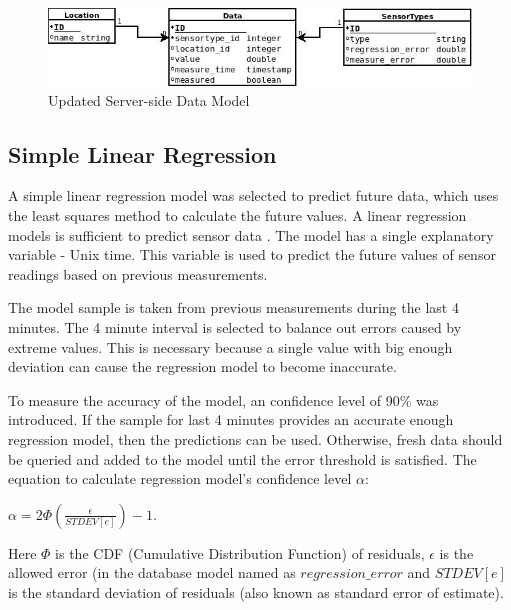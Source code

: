 \begin{figure}[h!]
\centering
\includegraphics[scale=0.6]{4/figures/data_model_final.jpg}
\caption{Updated Server-side Data Model}
\label{data_model_final}
\end{figure}

\subsection{Simple Linear Regression}

A simple linear regression model was selected to predict future data, which uses the least squares method to calculate the future values. A linear regression models is sufficient to predict sensor data \cite[p. 1066]{cluster_wsn_paper}. The model has a single explanatory variable - Unix time. This variable is used to predict the future values of sensor readings based on previous measurements. 

The model sample is taken from previous measurements during the last 4 minutes. The 4 minute interval is selected to balance out errors caused by extreme values. This is necessary because a single value with big enough deviation can cause the regression model to become inaccurate. 

To measure the accuracy of the model, an confidence level of 90\% was introduced. If the sample for last 4 minutes provides an accurate enough regression model, then the predictions can be used. Otherwise, fresh data should be queried and added to the model until the error threshold is satisfied. The equation to calculate regression model's confidence level $\alpha$:\\

\begin{center}
$\alpha = 2\Phi \left ( \frac{\epsilon}{STDEV[e]}  \right ) - 1$.
\end{center}


Here $\Phi$ is the CDF (Cumulative Distribution Function) of residuals, $\epsilon$ is the allowed error (in the database model named as $regression\_error$ and $STDEV[e]$ is the standard deviation of residuals (also known as standard error of estimate). 

